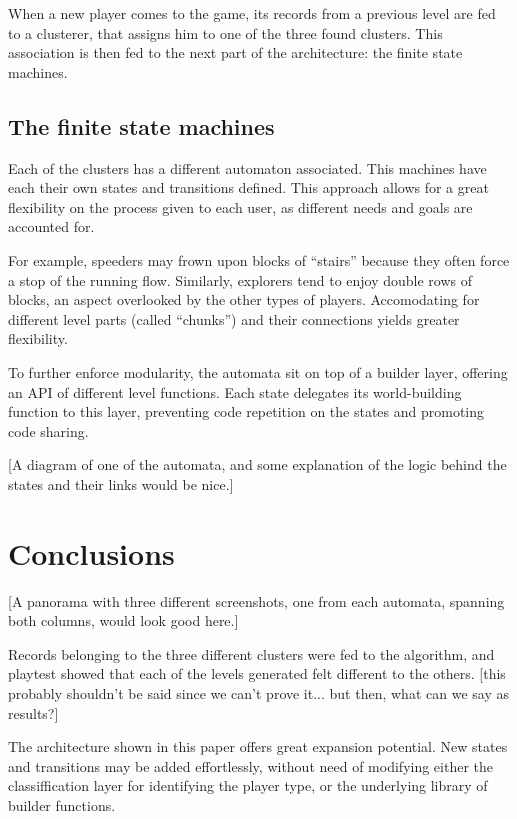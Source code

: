 \documentclass[conference]{IEEEtran}
\begin{document}
When a new player comes to the game, its records from a previous level are fed to a clusterer, that assigns him to one of the three found clusters. This association is then fed to the next part of the architecture: the finite state machines.

\subsection*{The finite state machines}

Each of the clusters has a different automaton associated. This machines have each their own states and transitions defined. This approach allows for a great flexibility on the process given to each user, as different needs and goals are accounted for.

For example, speeders may frown upon blocks of ``stairs'' because they often force a stop of the running flow. Similarly, explorers tend to enjoy double rows of blocks, an aspect overlooked by the other types of players. Accomodating for different level parts (called ``chunks'') and their connections yields greater flexibility.

To further enforce modularity, the automata sit on top of a builder layer, offering an API of different level functions. Each state delegates its world-building function to this layer, preventing code repetition on the states and promoting code sharing. 

[A diagram of one of the automata, and some explanation of the logic behind the states and their links would be nice.]

\section{Conclusions}

[A panorama with three different screenshots, one from each automata, spanning both columns, would look good here.]

Records belonging to the three different clusters were fed to the algorithm, and playtest showed that each of the levels generated felt different to the others. [this probably shouldn't be said since we can't prove it... but then, what can we say as results?]

The architecture shown in this paper offers great expansion potential. New states and transitions may be added effortlessly, without need of modifying either the classiffication layer for identifying the player type, or the underlying library of builder functions.
\end{document}
